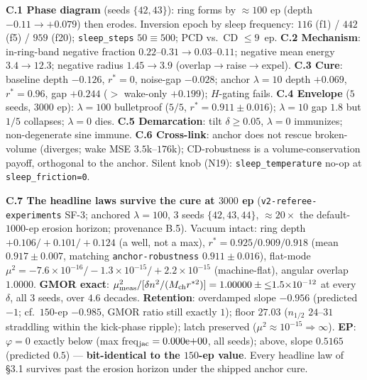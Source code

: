 \documentclass[10pt]{article}
\begin{document}
\textbf{C.1 Phase diagram} (seeds $\{42,43\}$): ring forms by $\approx100$ ep (depth $-0.11\to+0.079$) then erodes. Inversion epoch by sleep frequency: $116$ (f1) / $442$ (f5) / $959$ (f20); \texttt{sleep\_steps} $50\equiv500$; PCD vs.\ CD $\le9$~ep. \textbf{C.2 Mechanism}: in-ring-band negative fraction $0.22$--$0.31\to0.03$--$0.11$; negative mean energy $3.4\to12.3$; negative radius $1.45\to3.9$ (overlap$\to$raise$\to$expel). \textbf{C.3 Cure}: baseline depth $-0.126$, $r^*{=}0$, noise-gap $-0.028$; anchor $\lambda{=}10$ depth $+0.069$, $r^*{=}0.96$, gap $+0.244$ ($>$ wake-only $+0.199$); $H$-gating fails. \textbf{C.4 Envelope} ($5$ seeds, $3000$ ep): $\lambda{=}100$ bulletproof ($5/5$, $r^*{=}0.911\pm0.016$); $\lambda{=}10$ gap $1.8$ but $1/5$ collapses; $\lambda{=}0$ dies. \textbf{C.5 Demarcation}: tilt $\delta\ge0.05$, $\lambda{=}0$ immunizes; non-degenerate sine immune. \textbf{C.6 Cross-link}: anchor does not rescue broken-volume (diverges; wake MSE $3.5$k--$176$k); CD-robustness is a volume-conservation payoff, orthogonal to the anchor. Silent knob (N19): \texttt{sleep\_temperature} no-op at \texttt{sleep\_friction=0}.

\textbf{C.7 The headline laws survive the cure at $3000$ ep} (\texttt{v2-referee-experiments} SF-3; anchored $\lambda{=}100$, $3$ seeds $\{42,43,44\}$, $\approx20\times$ the default-$1000$-ep erosion horizon; provenance B.5). Vacuum intact: ring depth $+0.106/+0.101/+0.124$ (a well, not a max), $r^*=0.925/0.909/0.918$ (mean $0.917\pm0.007$, matching \texttt{anchor-robustness} $0.911\pm0.016$), flat-mode $\mu^2=-7.6{\times}10^{-16}/-1.3{\times}10^{-15}/+2.2{\times}10^{-15}$ (machine-flat), angular overlap $1.0000$. \textbf{GMOR exact}: $\mu^2_{\rm meas}/[\delta n^2/(M_{\rm ch}r^{*2})]=1.00000\pm{\le}1.5{\times}10^{-12}$ at every $\delta$, all $3$ seeds, over $4.6$ decades. \textbf{Retention}: overdamped slope $-0.956$ (predicted $-1$; cf.\ $150$-ep $-0.985$, GMOR ratio still exactly $1$); floor $27.03$ ($n_{1/2}$ $24$--$31$ straddling within the kick-phase ripple); latch preserved ($\mu^2\approx10^{-15}\Rightarrow\infty$). \textbf{EP}: $\varphi=0$ exactly below (max freq$_{\rm jac}=0.000\mathrm{e}{+}00$, all seeds); above, slope $0.5165$ (predicted $0.5$) --- \textbf{bit-identical to the $150$-ep value}. Every headline law of \S3.1 survives past the erosion horizon under the shipped anchor cure.
\end{document}
